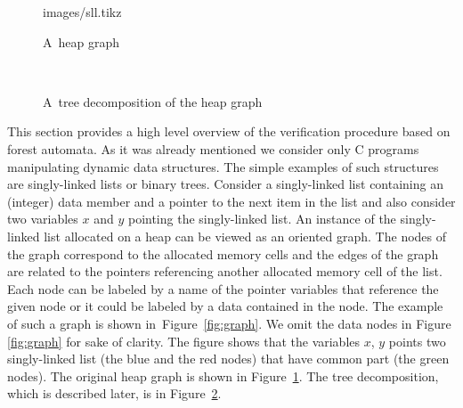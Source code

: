 \documentclass[fleqn,11pt]{ExcelAtFIT} %
\begin{document}
\begingroup
{}%
\begin{figure*}[t]
	\centering
	\begin{subfigure}{0.5\textwidth}
	\centering
		 {images/sll.tikz}
		\vspace{0.55cm}
		\caption{A~heap graph}
		\label{subfig:graph}
	\end{subfigure}%
	~
	\hspace{0.5cm}
	\begin{subfigure}{0.5\textwidth}
	\centering
		
		\caption{A~tree decomposition of the heap graph}
		\label{subfig:trees}
	\end{subfigure}%
	\vspace{0.5cm}
	\caption{
	Figure shows tree decomposition of a heap graph.
	The heap graph representing singly-linked list is shown in Figure \ref{subfig:graph}.
	The nodes could be labeled by a pointer variable that references allocated memory cell
	corresponding to the node.
	Moreover, the~cut-points are labeled by an order number that they have in an ordering over
	the cut-points.
	In this case, there are three cut-points with an order number $1$, $2$ and $3$.
	The graph is split to three trees shown in Figure \ref{subfig:trees} by the heap decomposition.
	The~new trees could contain the references to another trees, in this case tree $1$ and tree $3$
	have the nodes referencing tree $2$.}
	\label{fig:graph}
\end{figure*}
\endgroup

This section provides a high level overview of the verification procedure based
on forest automata.
As it was already mentioned we consider only C programs manipulating dynamic data structures.
The simple examples of such structures are singly-linked lists or binary trees.
Consider a singly-linked list containing an (integer) data member and a pointer
to the next item in the list and also
consider two variables $x$ and $y$ pointing the singly-linked list.
An instance of the singly-linked list allocated on a heap can be viewed as an oriented graph.
The nodes of the graph correspond to the allocated memory cells
and the edges of the graph are related to the pointers referencing
another allocated memory cell of the list.
Each node can be labeled by a name of the pointer variables that
reference the given node or it could be labeled by a data contained in the node.
The example of such a graph is shown in~Figure~\ref{fig:graph}.
We omit the data nodes in Figure \ref{fig:graph} for sake of clarity.
The figure shows that the variables $x$, $y$ points two singly-linked list (the blue and the red nodes) that
have common part (the green nodes).
The original heap graph is shown in Figure~\ref{subfig:graph}.
The tree decomposition, which is described later, is in Figure~\ref{subfig:trees}.
\end{document}
